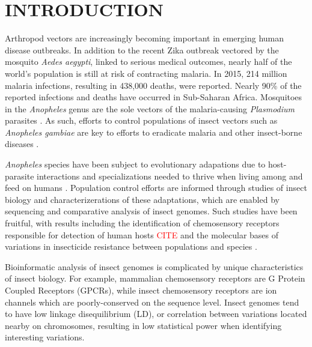 \chapter{\uppercase{Introduction}}

Arthropod vectors are increasingly becoming important in emerging human disease outbreaks.  In addition to the recent Zika outbreak vectored by the mosquito \emph{Aedes aegypti}, linked to serious medical outcomes, nearly half of the world's population is still at risk of contracting malaria.  In 2015, 214 million malaria infections, resulting in 438,000 deaths, were reported. Nearly 90\% of the reported infections and deaths have occurred in Sub-Saharan Africa.  Mosquitoes in the \emph{Anopheles} genus are the sole vectors of the malaria-causing \emph{Plasmodium} parasites \cite{Neafsey2015,Neafsey2010,Lawniczak2010}. As such, efforts to control populations of insect vectors such as \emph{Anopheles gambiae} are key to efforts to eradicate malaria and other insect-borne diseases \cite{Holt2002}.

\emph{Anopheles} species have been subject to evolutionary adapations due to host-parasite interactions and specializations needed to thrive when living among and feed on humans \cite{Neafsey2015}. Population control efforts are informed through studies of insect biology and characterizerations of these adaptations, which are enabled by sequencing and comparative analysis of insect genomes.   Such studies have been fruitful, with results including the identification of chemosensory receptors responsible for detection of human hosts \textcolor{red}{CITE} and the molecular bases of variations in insecticide resistance between populations and species \cite{Lawniczak2010}.

Bioinformatic analysis of insect genomes is complicated by unique characteristics of insect biology.  For example, mammalian chemosensory receptors are G Protein Coupled Receptors (GPCRs), while insect chemosensory receptors are ion channels which are poorly-conserved on the sequence level.  Insect genomes tend to have low linkage disequilibrium (LD), or correlation  between variations located nearby on chromosomes, resulting in low statistical power when identifying interesting variations.

